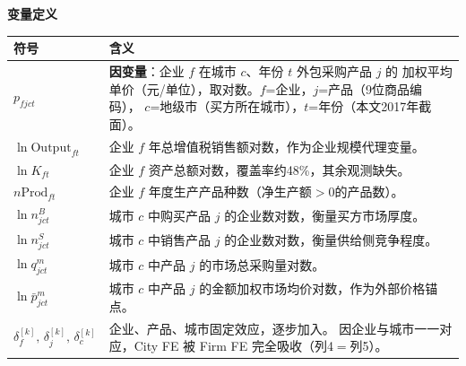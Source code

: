 \documentclass[12pt]{article}
\begin{document}
\medskip
\noindent\textbf{变量定义}

\smallskip
{\small
\begin{tabular}{@{} L{3.5cm} L{10.5cm} @{}}
\toprule
符号 & 含义 \\
\midrule
$p_{fjct}$ &
  \textbf{因变量}：企业 $f$ 在城市 $c$、年份 $t$ 外包采购产品 $j$ 的
  加权平均单价（元/单位），取对数。$f$=企业，$j$=产品（9位商品编码），
  $c$=地级市（买方所在城市），$t$=年份（本文2017年截面）。\\[4pt]
$\ln\mathrm{Output}_{ft}$ &
  企业 $f$ 年总增值税销售额对数，作为企业规模代理变量。\\[4pt]
$\ln K_{ft}$ &
  企业 $f$ 资产总额对数，覆盖率约48\%，其余观测缺失。\\[4pt]
$n\mathrm{Prod}_{ft}$ &
  企业 $f$ 年度生产产品种数（净生产额$>0$的产品数）。\\[4pt]
$\ln n^{B}_{jct}$ &
  城市 $c$ 中购买产品 $j$ 的企业数对数，衡量买方市场厚度。\\[4pt]
$\ln n^{S}_{jct}$ &
  城市 $c$ 中销售产品 $j$ 的企业数对数，衡量供给侧竞争程度。\\[4pt]
$\ln q^{m}_{jct}$ &
  城市 $c$ 中产品 $j$ 的市场总采购量对数。\\[4pt]
$\ln\bar{p}^{m}_{jct}$ &
  城市 $c$ 中产品 $j$ 的金额加权市场均价对数，作为外部价格锚点。\\[4pt]
$\delta_{f}^{[k]},\,\delta_{j}^{[k]},\,\delta_{c}^{[k]}$ &
  企业、产品、城市固定效应，逐步加入。
  因企业与城市一一对应，City FE 被 Firm FE 完全吸收（列4$=$列5）。\\
\bottomrule
\end{tabular}
}

\vspace{8pt}
\end{document}
